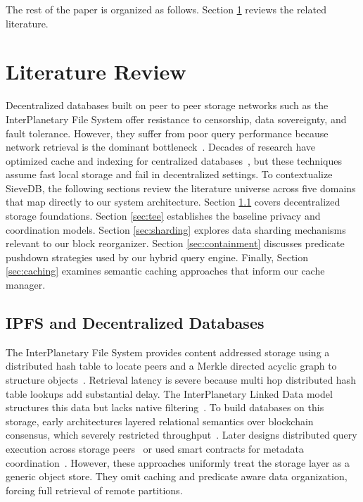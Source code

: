The rest of the paper is organized as follows. Section \ref{sec:litreview} reviews the related literature.

\section{Literature Review}
\label{sec:litreview}

Decentralized databases built on peer to peer storage networks such as the InterPlanetary File System offer resistance to censorship, data sovereignty, and fault tolerance. However, they suffer from poor query performance because network retrieval is the dominant bottleneck~\cite{trautwein2022design, henningsen2020mapping, daniel2022ipfs}. Decades of research have optimized cache and indexing for centralized databases~\cite{graefe2011modern, armbrust2021lakehouse}, but these techniques assume fast local storage and fail in decentralized settings. To contextualize SieveDB, the following sections review the literature universe across five domains that map directly to our system architecture. Section \ref{sec:ipfs} covers decentralized storage foundations. Section \ref{sec:tee} establishes the baseline privacy and coordination models. Section \ref{sec:sharding} explores data sharding mechanisms relevant to our block reorganizer. Section \ref{sec:containment} discusses predicate pushdown strategies used by our hybrid query engine. Finally, Section \ref{sec:caching} examines semantic caching approaches that inform our cache manager.

\subsection{IPFS and Decentralized Databases}
\label{sec:ipfs}
The InterPlanetary File System provides content addressed storage using a distributed hash table to locate peers and a Merkle directed acyclic graph to structure objects~\cite{benet2014ipfs}. Retrieval latency is severe because multi hop distributed hash table lookups add substantial delay. The InterPlanetary Linked Data model structures this data but lacks native filtering~\cite{ipld2023spec}. To build databases on this storage, early architectures layered relational semantics over blockchain consensus, which severely restricted throughput~\cite{mcconaghy2016bigchaindb}. Later designs distributed query execution across storage peers~\cite{yao2024minerva} or used smart contracts for metadata coordination~\cite{hossain2025mtdb, mukherjee2025web3db}. However, these approaches uniformly treat the storage layer as a generic object store. They omit caching and predicate aware data organization, forcing full retrieval of remote partitions.

